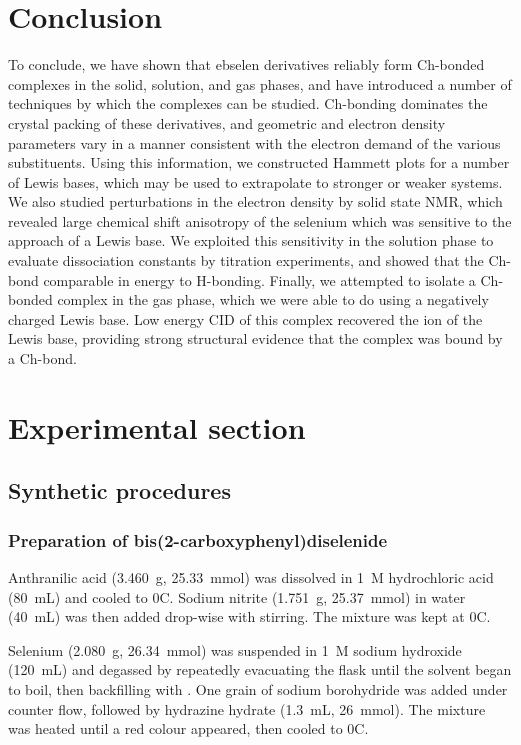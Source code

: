 \begin{refsection}
\section{Conclusion}
To conclude, we have shown that ebselen derivatives reliably form Ch-bonded complexes in the solid, solution, and gas phases, and have introduced a number of techniques by which the complexes can be studied.
Ch-bonding dominates the crystal packing of these derivatives, and geometric and electron density parameters vary in a manner consistent with the electron demand of the various substituents.
Using this information, we constructed Hammett plots for a number of Lewis bases, which may be used to extrapolate to stronger or weaker systems.
We also studied perturbations in the electron density by solid state NMR, which revealed large chemical shift anisotropy of the selenium which was sensitive to the approach of a Lewis base.
We exploited this sensitivity in the solution phase to evaluate dissociation constants by titration experiments, and showed that the Ch-bond comparable in energy to H-bonding.
Finally, we attempted to isolate a Ch-bonded complex in the gas phase, which we were able to do using a negatively charged Lewis base.
Low energy CID of this complex recovered the ion of the Lewis base, providing strong structural evidence that the complex was bound by a Ch-bond.

\section{Experimental section}

\subsection{Synthetic procedures}

\subsubsection[Preparation of \refcmpd{diselenide}]{Preparation of bis(2-carboxyphenyl)diselenide }\label{sec:diselenide_prep}
Anthranilic acid (3.460~g, 25.33~mmol) was dissolved in 1~M hydrochloric acid (80~mL) and cooled to 0\degree{}C.
Sodium nitrite (1.751~g, 25.37~mmol) in water (40~mL) was then added drop-wise with stirring.
The mixture was kept at 0\degree{}C.

Selenium (2.080~g, 26.34~mmol) was suspended in 1~M sodium hydroxide (120~mL) and degassed by repeatedly evacuating the flask until the solvent began to boil, then backfilling with .
One grain of sodium borohydride was added under  counter flow, followed by hydrazine hydrate (1.3~mL, 26~mmol).
The mixture was heated until a red colour appeared, then cooled to 0\degree{}C.


\end{refsection}
